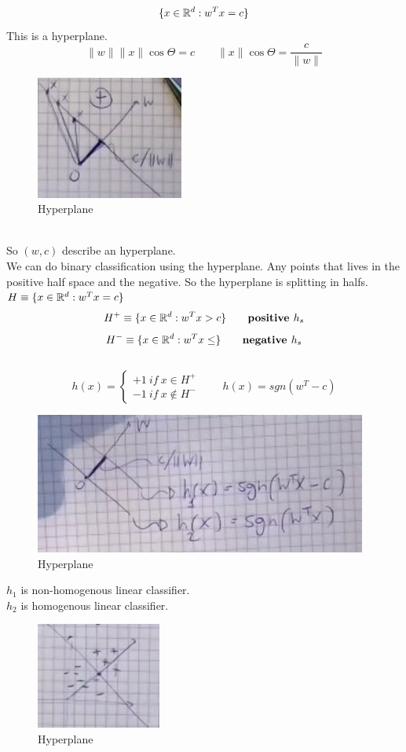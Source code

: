 \documentclass[../main.tex]{subfiles}
\begin{document}
$$
\{ x \in \mathbb{R}^d : w^Tx = c\}
$$
This is a hyperplane.
$$ 
\|w \| \| x \| \cos \Theta = c
\qquad
\|x \| \cos \Theta = \frac{c}{\| w\|}
$$
\begin{figure}[h]
    \centering
    \includegraphics[width=0.4\linewidth]{../img/lez12-img4.JPG}
    \caption{Hyperplane}
\end{figure}\\
So $ (w,c)$ describe an hyperplane.
\\
We can do binary classification using the hyperplane. Any points that lives in the positive half space and the negative. So the hyperplane is splitting in halfs.
$ H \equiv \{ x \in \mathbb{R}^d : w^T x = c \}$\
$$
H^+ \equiv \{x \in \mathbb{R}^d : w^Tx > c \} \qquad \textbf{positive $h_s$}
$$
$$
H^- \equiv \{x \in \mathbb{R}^d : w^Tx \leq \} \qquad \textbf{negative $h_s$}
$$\
$$ h(x) = 
\begin{cases}
+1 \ if \ x \in H^+\\
-1 \ if \ x \not\in H^-
\end{cases} \qquad
h(x) = sgn (w^T -c)
$$
\begin{figure}[h]
    \centering
    \includegraphics[width=0.6\linewidth]{../img/lez12-img5.JPG}
    \caption{Hyperplane}
\end{figure}
\newpage
$h_1$ is non-homogenous linear classifier.\\
$h_2$ is homogenous linear classifier.
\begin{figure}[h]
    \centering
    \includegraphics[width=0.3\linewidth]{../img/lez12-img6.JPG}
    \caption{Hyperplane}
\end{figure}
\end{document}
